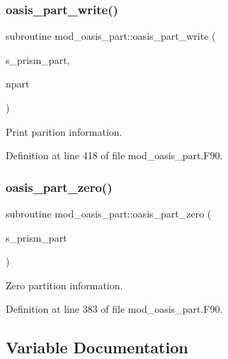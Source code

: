 \subsubsection{\texorpdfstring{oasis\+\_\+part\+\_\+write()}{oasis\_part\_write()}}
{\footnotesize\ttfamily subroutine mod\+\_\+oasis\+\_\+part\+::oasis\+\_\+part\+\_\+write (\begin{DoxyParamCaption}\item[{type(\hyperlink{structmod__oasis__part_1_1prism__part__type}{prism\+\_\+part\+\_\+type}), intent(in)}]{s\+\_\+prism\+\_\+part,  }\item[{integer(ip\+\_\+i4\+\_\+p), intent(in)}]{npart }\end{DoxyParamCaption})\hspace{0.3cm}{\ttfamily [private]}}



Print parition information. 



Definition at line 418 of file mod\+\_\+oasis\+\_\+part.\+F90.

\mbox{\label{namespacemod__oasis__part_a17c747bc29d25b558df42524bd63ac90}} 
\subsubsection{\texorpdfstring{oasis\+\_\+part\+\_\+zero()}{oasis\_part\_zero()}}
{\footnotesize\ttfamily subroutine mod\+\_\+oasis\+\_\+part\+::oasis\+\_\+part\+\_\+zero (\begin{DoxyParamCaption}\item[{type(\hyperlink{structmod__oasis__part_1_1prism__part__type}{prism\+\_\+part\+\_\+type}), intent(inout)}]{s\+\_\+prism\+\_\+part }\end{DoxyParamCaption})\hspace{0.3cm}{\ttfamily [private]}}



Zero partition information. 



Definition at line 383 of file mod\+\_\+oasis\+\_\+part.\+F90.



\subsection{Variable Documentation}
\mbox{\label{namespacemod__oasis__part_ab68d087792db0351181c9a97025d793b}} 
